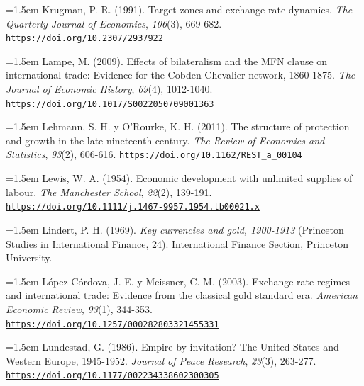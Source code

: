 \documentclass[10pt,a4paper]{article}
\begin{document}
{\sloppy\noindent\hangindent=1.5em Krugman, P. R. (1991). Target zones and exchange rate dynamics. \textit{The Quarterly Journal of Economics}, \textit{106}(3), 669-682. \href{https://doi.org/10.2307/2937922}{\nolinkurl{https://doi.org/10.2307/2937922}}\par}

{\sloppy\noindent\hangindent=1.5em Lampe, M. (2009). Effects of bilateralism and the MFN clause on international trade: Evidence for the Cobden-Chevalier network, 1860-1875. \textit{The Journal of Economic History}, \textit{69}(4), 1012-1040. \href{https://doi.org/10.1017/S0022050709001363}{\nolinkurl{https://doi.org/10.1017/S0022050709001363}}\par}

{\sloppy\noindent\hangindent=1.5em Lehmann, S. H. y O'Rourke, K. H. (2011). The structure of protection and growth in the late nineteenth century. \textit{The Review of Economics and Statistics}, \textit{93}(2), 606-616. \href{https://doi.org/10.1162/REST_a_00104}{\nolinkurl{https://doi.org/10.1162/REST_a_00104}}\par}

{\sloppy\noindent\hangindent=1.5em Lewis, W. A. (1954). Economic development with unlimited supplies of labour. \textit{The Manchester School}, \textit{22}(2), 139-191. \href{https://doi.org/10.1111/j.1467-9957.1954.tb00021.x}{\nolinkurl{https://doi.org/10.1111/j.1467-9957.1954.tb00021.x}}\par}

\noindent\hangindent=1.5em Lindert, P. H. (1969). \textit{Key currencies and gold, 1900-1913} (Princeton Studies in International Finance, 24). International Finance Section, Princeton University.

{\sloppy\noindent\hangindent=1.5em López-Córdova, J. E. y Meissner, C. M. (2003). Exchange-rate regimes and international trade: Evidence from the classical gold standard era. \textit{American Economic Review}, \textit{93}(1), 344-353. \href{https://doi.org/10.1257/000282803321455331}{\nolinkurl{https://doi.org/10.1257/000282803321455331}}\par}

{\sloppy\noindent\hangindent=1.5em Lundestad, G. (1986). Empire by invitation? The United States and Western Europe, 1945-1952. \textit{Journal of Peace Research}, \textit{23}(3), 263-277. \href{https://doi.org/10.1177/002234338602300305}{\nolinkurl{https://doi.org/10.1177/002234338602300305}}\par}
\end{document}
